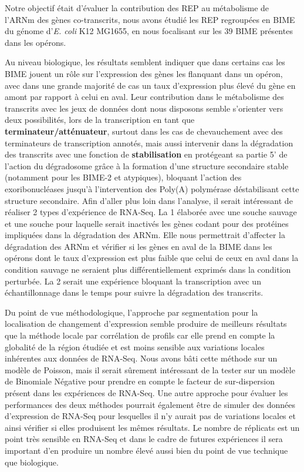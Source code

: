\documentclass[12pt,a4paper]{report}
\begin{document}
\begin{onehalfspace}
Notre objectif était d'évaluer la contribution des REP au métabolisme de l'ARNm des gènes co-transcrits, nous avons étudié les REP regroupées en BIME du génome d'\textit{E. coli} K12 MG1655, en nous focalisant sur les 39 BIME présentes dans les opérons.

Au niveau biologique, les résultats semblent indiquer que dans certains cas les BIME jouent un rôle sur l'expression des gènes les flanquant dans un opéron, avec dans une grande majorité de cas un taux d'expression plus élevé du gène en amont par rapport à celui en aval. Leur contribution dans le métabolisme des transcrits avec les jeux de données dont nous disposons semble s'orienter vers deux possibilités, lors de la transcription en tant que \textbf{terminateur/atténuateur}, surtout dans les cas de chevauchement avec des terminateurs de transcription annotés, mais aussi intervenir dans la dégradation des transcrits avec une fonction de \textbf{stabilisation} en protégeant sa partie 5' de l'action du dégradosome grâce à la formation d'une structure secondaire stable (notamment pour les BIME-2  et atypiques), bloquant l'action des exoribonucléases jusqu'à l'intervention des Poly(A) polymérase déstabilisant cette structure secondaire. 
Afin d'aller plus loin dans l'analyse, il serait intéressant de réaliser 2 types d'expérience de RNA-Seq. La 1 élaborée avec une souche sauvage et une souche pour laquelle serait inactivés les gènes codant pour des protéines impliquées dans la dégradation des ARNm. Elle nous permettrait d'affecter la dégradation des ARNm et vérifier si les gènes en aval de la BIME dans les opérons dont le taux d'expression est plus faible que celui de ceux en aval dans la condition sauvage ne seraient plus différentiellement exprimés dans la condition perturbée. La 2 serait une expérience bloquant la transcription avec un échantillonnage dans le temps pour suivre la dégradation des transcrits.

Du point de vue méthodologique, l'approche par segmentation pour la localisation de changement d'expression semble produire de meilleurs résultats que la méthode locale par corrélation de profils car elle prend en compte la globalité de la région étudiée et est moins sensible aux variations locales inhérentes aux données de RNA-Seq. Nous avons bâti cette méthode sur un modèle de Poisson, mais il serait sûrement intéressant de la tester sur un modèle de Binomiale Négative pour prendre en compte le facteur de sur-dispersion présent dans les expériences de RNA-Seq. Une autre approche pour évaluer les performances des deux méthodes pourrait également être de simuler des données d'expression de RNA-Seq pour lesquelles il n'y aurait pas de variations locales et ainsi vérifier si elles produisent les mêmes résultats.
Le nombre de réplicats est un point très sensible en RNA-Seq et dans le cadre de futures expériences il sera important d'en produire un nombre élevé aussi bien du point de vue technique que biologique.

\end{onehalfspace}
\end{document}
